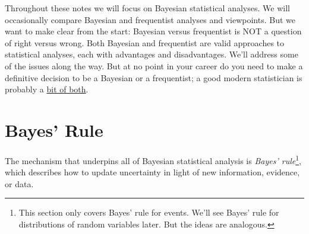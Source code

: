 \documentclass[
]{book}
\theoremstyle{definition}
\theoremstyle{definition}
\theoremstyle{definition}
\theoremstyle{remark}
\begin{document}
Throughout these notes we will focus on Bayesian statistical analyses. We will occasionally compare Bayesian and frequentist analyses and viewpoints. But we want to make clear from the start: Bayesian versus frequentist is NOT a question of right versus wrong. Both Bayesian and frequentist are valid approaches to statistical analyses, each with advantages and disadvantages. We'll address some of the issues along the way. But at no point in your career do you need to make a definitive decision to be a Bayesian or a frequentist; a good modern statistician is probably a \href{https://tenor.com/view/star-lord-bit-of-both-chris-pratt-guardians-of-the-galaxy-peter-quill-gif-11821953}{bit of both}.

\hypertarget{bayes-rule}{%
\chapter{Bayes' Rule}\label{bayes-rule}}

The mechanism that underpins all of Bayesian statistical analysis is \emph{Bayes' rule}\footnote{This section only covers Bayes' rule for events. We'll see Bayes' rule for distributions of random variables later. But the ideas are analogous.}, which describes how to update uncertainty in light of new information, evidence, or data.
\end{document}
